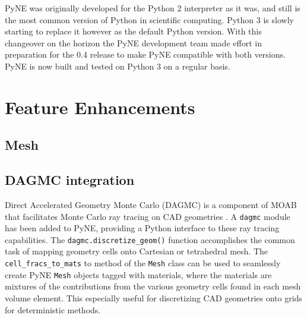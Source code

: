 \documentclass{anstrans}
\begin{document}
PyNE was originally developed for the Python 2 interpreter as it was, and still is the most common version of Python in scientific computing. Python 3 is slowly starting to replace it however as the default Python version. With this changeover on the horizon the PyNE development team made effort in preparation for the 0.4 release to make PyNE compatible with both versions. PyNE is now built and tested on Python 3 on a regular basis.

\section{Feature Enhancements}

\subsection{Mesh}

%
%

\subsection{DAGMC integration}

Direct Accelerated Geometry Monte Carlo (DAGMC) is a component of MOAB that
facilitates Monte Carlo ray tracing on CAD geometries
\cite{tautges_acceleration_2009}.  A \texttt{dagmc} module has been added to
PyNE, providing a Python interface to these ray tracing capabilities. The
\texttt{dagmc.discretize\_geom()} function accomplishes the common task of
mapping geometry cells onto Cartesian or tetrahedral mesh. The
\texttt{cell\_fracs\_to\_mats} to method of the \texttt{Mesh} class can be used
to seamlessly create PyNE \texttt{Mesh} objects tagged with materials, where the
materials are mixtures of the contributions from the various geometry cells
found in each mesh volume element. This especially useful for discretizing CAD
geometries onto grids for deterministic methods.

\end{document}
